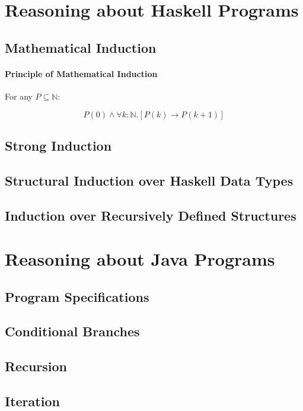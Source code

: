 \documentclass[10pt,twoside,twocolumn]{article}
\begin{document}
\section{Reasoning about Haskell Programs}


\subsection{Mathematical Induction}


\paragraph{Principle of Mathematical Induction}

For any $P\subseteq\mathbb{N}$:

\[
P\left(0\right)\land\forall k:\mathbb{N}.\left[P\left(k\right)\rightarrow P\left(k+1\right)\right]
\]



\subsection{Strong Induction}


\subsection{Structural Induction over Haskell Data Types}


\subsection{Induction over Recursively Defined Structures}


\section{Reasoning about Java Programs}


\subsection{Program Specifications}


\subsection{Conditional Branches}


\subsection{Recursion}


\subsection{Iteration}
\end{document}

